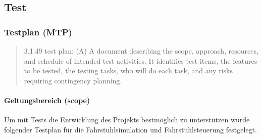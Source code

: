\subsection{Test}

\subsubsection{Testplan (MTP)}
\begin{quote}\label{Quote:Testplan}
3.1.49 test plan: (A) A document describing the scope, approach, resources, and schedule of intended test activities. It identifies test items, the features to be tested, the testing tasks, who will do each task, and any risks requiring contingency planning. \cite[3.1 Definitions, Seite 11]{IEEE829-2008}
\end{quote}

\paragraph{Geltungsbereich (scope)}
Um mit Tests die Entwicklung des Projekts bestmöglich zu unterstützen wurde folgender Testplan für die Fahrstuhlsimulation und Fahrstuhlsteuerung festgelegt.

